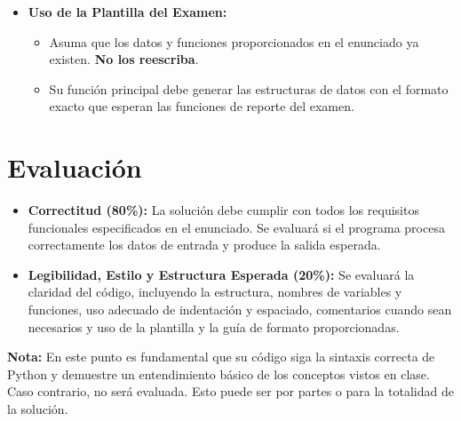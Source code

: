 \documentclass[11pt,a4paper]{article}
\begin{document}
\begin{itemize}[leftmargin=*]
    \item \textbf{Uso de la Plantilla del Examen:}
    \begin{itemize}
        \item Asuma que los datos y funciones proporcionados en el enunciado ya existen. \textbf{No los reescriba}.
        \item Su función principal debe generar las estructuras de datos con el formato exacto que esperan las funciones de reporte del examen.
    \end{itemize}
\end{itemize}

\newpage

\section{Evaluación}

\begin{itemize}[leftmargin=*]
    \item \textbf{Correctitud (80\%):} La solución debe cumplir con todos los requisitos funcionales especificados en el enunciado. Se evaluará si el programa procesa correctamente los datos de entrada y produce la salida esperada.
    
    \item \textbf{Legibilidad, Estilo y Estructura Esperada (20\%):} Se evaluará la claridad del código, incluyendo la estructura, nombres de variables y funciones, uso adecuado de indentación y espaciado, comentarios cuando sean necesarios y uso de la plantilla y la guía de formato proporcionadas.
\end{itemize}

\textbf{Nota:} En este punto es fundamental que su código siga la sintaxis correcta de Python y demuestre un entendimiento básico de los conceptos vistos en clase. Caso contrario, no será evaluada. Esto puede ser por partes o para la totalidad de la solución.
\end{document}
